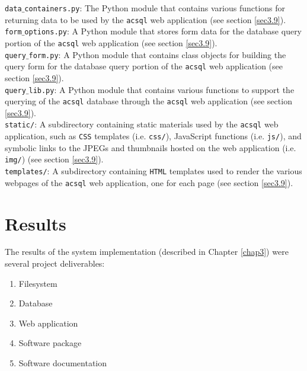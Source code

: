 \documentclass[10pt,journal,compsoc]{IEEEtran}
\begin{document}
\noindent\texttt{data$\_$containers.py}: The Python module that contains various functions for returning data to be used by the \texttt{acsql} web application (see section \ref{sec3.9}).\\

\noindent\texttt{form$\_$options.py}: A Python module that stores form data for the database query portion of the \texttt{acsql} web application (see section \ref{sec3.9}).\\

\noindent\texttt{query$\_$form.py}: A Python module that contains class objects for building the query form for the database query portion of the \texttt{acsql} web application (see section \ref{sec3.9}).\\

\noindent\texttt{query$\_$lib.py}: A Python module that contains various functions to support the querying of the \texttt{acsql} database through the \texttt{acsql} web application (see section \ref{sec3.9}).\\

\noindent\texttt{static/}: A subdirectory containing static materials used by the \texttt{acsql} web application, such as \texttt{CSS} templates (i.e. \texttt{css/}), JavaScript functions
(i.e. \texttt{js/}), and symbolic links to the JPEGs and thumbnails hosted on the web application (i.e. \texttt{img/}) (see section \ref{sec3.9}).\\

\noindent\texttt{templates/}: A subdirectory containing \texttt{HTML} templates used to render the various webpages of the \texttt{acsql} web application, one for each page (see section \ref{sec3.9}).\\


\section{Results} \label{chap4}

The results of the system implementation (described in Chapter \ref{chap3}) were several project deliverables:

\begin{enumerate}
\item Filesystem
\item Database
\item Web application
\item Software package
\item Software documentation
\end{enumerate}
\end{document}
